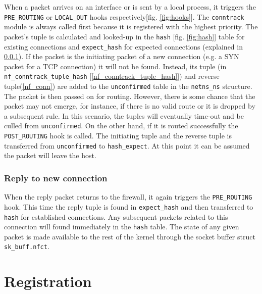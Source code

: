 \documentclass[a4paper,10pt]{article}
\newcommand{\figref}[1]{[fig. \ref{#1}]}
\newcommand{\cref}[1]{[\ref{#1}]}
\begin{document}
When a packet arrives on an interface or is sent by a local process,
it triggers the \verb|PRE_ROUTING| or \verb|LOCAL_OUT| hooks
respectively\figref{fig:hooks}. The \verb|conntrack| module is always called first
because it is registered with the highest priority. The packet's tuple
is calculated\cite{jhash} and looked-up in the \verb|hash| \figref{fig:hash} table
for existing connections and \verb|expect_hash| for expected
connections (explained in \ref{reply}). If the packet is the
initiating packet of a new connection (e.g. a SYN packet for a TCP
connection\cite{tcpip-illustrated}) it will not be found. Instead, its tuple (in
\verb|nf_conntrack_tuple_hash| \cref{nf_conntrack_tuple_hash}) and
reverse tuple(\ref{nf_conn}) are added to the \verb|unconfirmed| table
in the \verb|netns_ns| structure. The packet is then passed on for
routing. However, there is some chance that the packet may not emerge,
for instance, if there is no valid route or it is dropped by a
subsequent rule\cite{netfilter-internals}. In this scenario, the
tuples will eventually time-out and be culled from \verb|unconfirmed|.
On the other hand, if it is routed successfully the
\verb|POST_ROUTING| hook is called. The initiating tuple and the reverse
tuple is transferred from \verb|unconfirmed| to \verb|hash_expect|. At
this point it can be assumed the packet will leave the host.

\subsubsection{Reply to new connection}\label{reply}
When the reply packet returns to the firewall, it again triggers the
\verb|PRE_ROUTING| hook. This time the reply tuple is found in
\verb|expect_hash| and then transferred to \verb|hash| for established
connections. Any subsequent packets related to this connection will
found immediately in the \verb|hash| table. The state of any given
packet is made available to the rest of the kernel through the socket buffer struct
\verb|sk_buff.nfct|.

\section{Registration}\label{registration}



%

\end{document}
